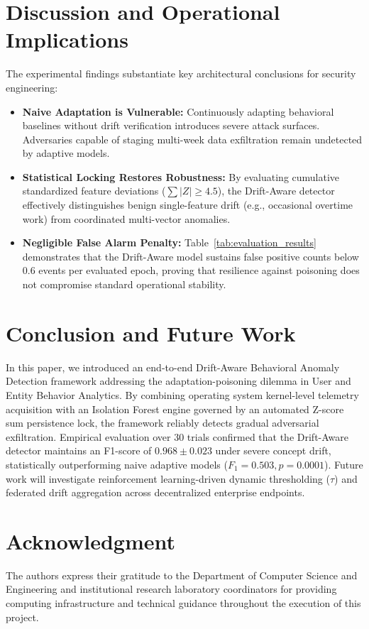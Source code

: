 \documentclass[conference]{IEEEtran}
\begin{document}
\section{Discussion and Operational Implications}
The experimental findings substantiate key architectural conclusions for security engineering:
\begin{itemize}
    \item \textbf{Naive Adaptation is Vulnerable:} Continuously adapting behavioral baselines without drift verification introduces severe attack surfaces. Adversaries capable of staging multi-week data exfiltration remain undetected by adaptive models.
    \item \textbf{Statistical Locking Restores Robustness:} By evaluating cumulative standardized feature deviations ($\sum |Z| \ge 4.5$), the Drift-Aware detector effectively distinguishes benign single-feature drift (e.g., occasional overtime work) from coordinated multi-vector anomalies.
    \item \textbf{Negligible False Alarm Penalty:} Table~\ref{tab:evaluation_results} demonstrates that the Drift-Aware model sustains false positive counts below $0.6$ events per evaluated epoch, proving that resilience against poisoning does not compromise standard operational stability.
\end{itemize}

\section{Conclusion and Future Work}
In this paper, we introduced an end-to-end Drift-Aware Behavioral Anomaly Detection framework addressing the adaptation-poisoning dilemma in User and Entity Behavior Analytics. By combining operating system kernel-level telemetry acquisition with an Isolation Forest engine governed by an automated Z-score sum persistence lock, the framework reliably detects gradual adversarial exfiltration. Empirical evaluation over 30 trials confirmed that the Drift-Aware detector maintains an F1-score of $0.968 \pm 0.023$ under severe concept drift, statistically outperforming naive adaptive models ($F_1 = 0.503, p = 0.0001$). Future work will investigate reinforcement learning-driven dynamic thresholding ($\tau$) and federated drift aggregation across decentralized enterprise endpoints.

\section*{Acknowledgment}
The authors express their gratitude to the Department of Computer Science and Engineering and institutional research laboratory coordinators for providing computing infrastructure and technical guidance throughout the execution of this project.
\end{document}

